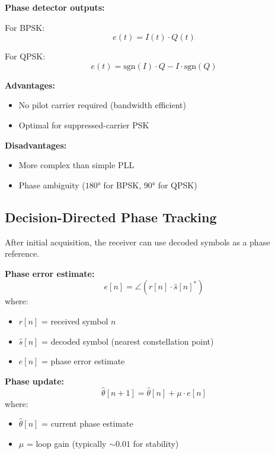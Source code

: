 \textbf{Phase detector outputs:}

For BPSK:
\begin{equation}
e(t) = I(t) \cdot Q(t)
\end{equation}

For QPSK:
\begin{equation}
e(t) = \text{sgn}(I) \cdot Q - I \cdot \text{sgn}(Q)
\end{equation}

\textbf{Advantages:}
\begin{itemize}
\item[\checkmark] No pilot carrier required (bandwidth efficient)
\item[\checkmark] Optimal for suppressed-carrier PSK
\end{itemize}

\textbf{Disadvantages:}
\begin{itemize}
\item[\texttimes] More complex than simple PLL
\item[\texttimes] Phase ambiguity ($180°$ for BPSK, $90°$ for QPSK)
\end{itemize}

\subsection{Decision-Directed Phase Tracking}

After initial acquisition, the receiver can use decoded symbols as a phase reference.

\textbf{Phase error estimate:}
\begin{equation}
e[n] = \angle(r[n] \cdot \hat{s}[n]^*)
\end{equation}
where:
\begin{itemize}
\item $r[n]$ = received symbol $n$
\item $\hat{s}[n]$ = decoded symbol (nearest constellation point)
\item $e[n]$ = phase error estimate
\end{itemize}

\textbf{Phase update:}
\begin{equation}
\hat{\theta}[n+1] = \hat{\theta}[n] + \mu \cdot e[n]
\end{equation}
where:
\begin{itemize}
\item $\hat{\theta}[n]$ = current phase estimate
\item $\mu$ = loop gain (typically $\sim 0.01$ for stability)
\end{itemize}

